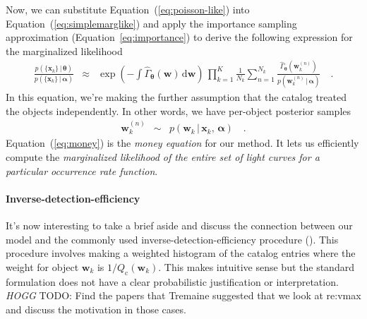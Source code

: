 \documentclass[12pt,preprint]{aastex}
\newcommand{\Eq}[1]{Equation~(\ref{eq:#1})}
\newcommand{\eq}[1]{\Eq{#1}}
\newcommand{\eqalt}[1]{Equation~\ref{eq:#1}}
\newcommand{\eqlabel}[1]{\label{eq:#1}}
\newcommand{\dd}{\ensuremath{\,\mathrm{d}}}
\newcommand{\bvec}[1]{\ensuremath{\boldsymbol{#1}}}
\newcommand{\todo}[3]{{\color{#2} \emph{#1} TODO: #3}}
\newcommand{\hoggtodo}[1]{\todo{HOGG}{blue}{#1}}
\newcommand{\rate}{\ensuremath{\Gamma}}
\newcommand{\ratepar}{{\ensuremath{\theta}}}
\newcommand{\ratepars}{{\ensuremath{\bvec{\ratepar}}}}
\newcommand{\obs}[1]{\ensuremath{\hat{#1}}}
\newcommand{\completeness}{{\ensuremath{Q_\mathrm{c}}}}
\newcommand{\data}{{\ensuremath{\bvec{x}}}}
\newcommand{\entry}{{\ensuremath{\bvec{w}}}}
\newcommand{\interim}{{\ensuremath{\bvec{\alpha}}}}
\begin{document}
Now, we can substitute \eq{poisson-like} into \eq{simplemarglike} and apply
the importance sampling approximation (\eqalt{importance}) to derive the
following expression for the marginalized likelihood
\begin{eqnarray}\eqlabel{money}
\frac{p(\{\data_k\}\,|\,\ratepars)}{p(\{\data_k\}\,|\,\interim)} &\approx&
    \exp\left(-\int \obs{\rate}_\ratepars (\entry) \dd\entry\right) \,
    \prod_{k=1}^K
    \frac{1}{N_k} \sum_{n=1}^{N_k}
    \frac{\obs{\rate}_\ratepars (\entry_k^{(n)})}
         {p(\entry_k^{(n)}\,|\,\interim)} \quad.
\end{eqnarray}
In this equation, we're making the further assumption that the catalog treated
the objects independently.
In other words, we have per-object posterior samples
\begin{eqnarray}
\entry_k^{(n)} &\sim& p(\entry_k\,|\,\data_k,\,\interim) \quad.
\end{eqnarray}
\Eq{money} is the \emph{money equation} for our method.
It lets us efficiently compute the \emph{marginalized likelihood of the entire
set of light curves for a particular occurrence rate function}.

\paragraph{Inverse-detection-efficiency}
It's now interesting to take a brief aside and discuss the connection between
our model and the commonly used inverse-detection-efficiency procedure
(\citealt{howard,dressing,petigura}).
This procedure involves making a weighted histogram of the catalog entries
where the weight for object $\entry_k$ is $1/\completeness(\entry_k)$.
This makes intuitive sense but the standard formulation does not have a clear
probabilistic justification or interpretation.
\hoggtodo{Find the papers that Tremaine suggested that we look at re:vmax and
discuss the motivation in those cases.}
\end{document}
